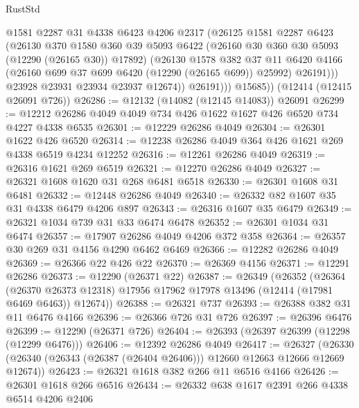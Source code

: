 \begin{lexlean}{RustStd}
\begin{coremodule}
{\begin{coremodule}
{{{{{{{{{{{{{{{{{{{{{{{{{{{{{{{{{{{{{{{{{{{{{{{{{{                  @1581
                  @2287
                  @31
                  @4338
                  @6423
                  @4206
                  @2317
                  (@26125
                    @1581
                    @2287
                    @6423
                    (@26130
                      @370
                      @1580
                      @360
                      @39
                      @5093
                      @6422
                      (@26160 @30 @360 @30 @5093 (@12290 (@26165 @30)) @17892)
                      (@26130
                        @1578
                        @382
                        @37
                        @11
                        @6420
                        @4166
                        (@26160 @699 @37 @699 @6420 (@12290 (@26165 @699)) @25992)
                        @26191)))
                  @23928
                  @23931
                  @23934
                  @23937
                  @12674))
              @26191)))
        @15685))
    (@12414 (@12415 @26091 @726))
@26286 := @12132 (@14082 (@12145 @14083)) @26091
@26299 := @12212 @26286 @4049 @4049 @734 @426 @1622 @1627 @426 @6520 @734 @4227 @4338 @6535
@26301 := @12229 @26286 @4049
@26304 := @26301 @1622 @426 @6520
@26314 := @12238 @26286 @4049 @364 @426 @1621 @269 @4338 @6519 @4234 @12252
@26316 := @12261 @26286 @4049
@26319 := @26316 @1621 @269 @6519
@26321 := @12270 @26286 @4049
@26327 := @26321 @1608 @1620 @31 @268 @6481 @6518
@26330 := @26301 @1608 @31 @6481
@26332 := @12448 @26286 @4049
@26340 := @26332 @82 @1607 @35 @31 @4338 @6479 @4206 @897
@26343 := @26316 @1607 @35 @6479
@26349 := @26321 @1034 @739 @31 @33 @6474 @6478
@26352 := @26301 @1034 @31 @6474
@26357 := @17907 @26286 @4049 @4206 @372 @358
@26364 := @26357 @30 @269 @31 @4156 @4290 @6462 @6469
@26366 := @12282 @26286 @4049
@26369 := @26366 @22 @426 @22
@26370 := @26369 @4156
@26371 := @12291 @26286
@26373 := @12290 (@26371 @22)
@26387 := @26349
    (@26352
      (@26364
        (@26370 @26373 @12318)
        @17956
        @17962
        @17978
        @13496
        (@12414 (@17981 @6469 @6463))
        @12674))
@26388 := @26321 @737
@26393 := @26388 @382 @31 @11 @6476 @4166
@26396 := @26366 @726 @31 @726
@26397 := @26396 @6476
@26399 := @12290 (@26371 @726)
@26404 := @26393 (@26397 @26399 (@12298 (@12299 @6476)))
@26406 := @12392 @26286 @4049
@26417 := @26327
    (@26330 (@26340 (@26343 (@26387 (@26404 @26406))) @12660 @12663 @12666 @12669 @12674))
@26423 := @26321 @1618 @382 @266 @11 @6516 @4166
@26426 := @26301 @1618 @266 @6516
@26434 := @26332 @638 @1617 @2391 @266 @4338 @6514 @4206 @2406
}}}}}}}}}}}}}}}}}}}}}}}}}}}}}}}}}}}}}}}}}}}}}}}}}}
\end{coremodule}}
\end{coremodule}
\end{lexlean}
